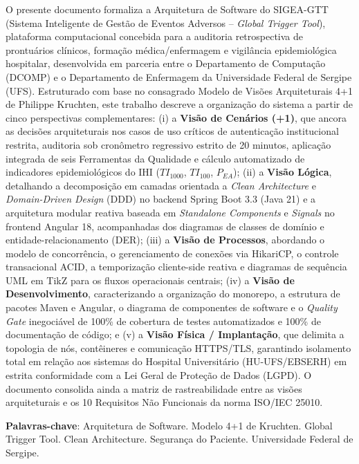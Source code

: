 \begin{resumo}
O presente documento formaliza a Arquitetura de Software do SIGEA-GTT (Sistema Inteligente de Gestão de Eventos Adversos -- \textit{Global Trigger Tool}), plataforma computacional concebida para a auditoria retrospectiva de prontuários clínicos, formação médica/enfermagem e vigilância epidemiológica hospitalar, desenvolvida em parceria entre o Departamento de Computação (DCOMP) e o Departamento de Enfermagem da Universidade Federal de Sergipe (UFS). Estruturado com base no consagrado Modelo de Visões Arquiteturais 4+1 de Philippe Kruchten, este trabalho descreve a organização do sistema a partir de cinco perspectivas complementares: (i) a \textbf{Visão de Cenários (+1)}, que ancora as decisões arquiteturais nos casos de uso críticos de autenticação institucional restrita, auditoria sob cronômetro regressivo estrito de 20 minutos, aplicação integrada de seis Ferramentas da Qualidade e cálculo automatizado de indicadores epidemiológicos do IHI ($TI_{1000}$, $TI_{100}$, $P_{EA}$); (ii) a \textbf{Visão Lógica}, detalhando a decomposição em camadas orientada a \textit{Clean Architecture} e \textit{Domain-Driven Design} (DDD) no backend Spring Boot 3.3 (Java 21) e a arquitetura modular reativa baseada em \textit{Standalone Components} e \textit{Signals} no frontend Angular 18, acompanhadas dos diagramas de classes de domínio e entidade-relacionamento (DER); (iii) a \textbf{Visão de Processos}, abordando o modelo de concorrência, o gerenciamento de conexões via HikariCP, o controle transacional ACID, a temporização cliente-side reativa e diagramas de sequência UML em TikZ para os fluxos operacionais centrais; (iv) a \textbf{Visão de Desenvolvimento}, caracterizando a organização do monorepo, a estrutura de pacotes Maven e Angular, o diagrama de componentes de software e o \textit{Quality Gate} inegociável de 100\% de cobertura de testes automatizados e 100\% de documentação de código; e (v) a \textbf{Visão Física / Implantação}, que delimita a topologia de nós, contêineres e comunicação HTTPS/TLS, garantindo isolamento total em relação aos sistemas do Hospital Universitário (HU-UFS/EBSERH) em estrita conformidade com a Lei Geral de Proteção de Dados (LGPD). O documento consolida ainda a matriz de rastreabilidade entre as visões arquiteturais e os 10 Requisitos Não Funcionais da norma ISO/IEC 25010.

\vspace{\onelineskip}
\noindent
\textbf{Palavras-chave}: Arquitetura de Software. Modelo 4+1 de Kruchten. Global Trigger Tool. Clean Architecture. Segurança do Paciente. Universidade Federal de Sergipe.
\end{resumo}
